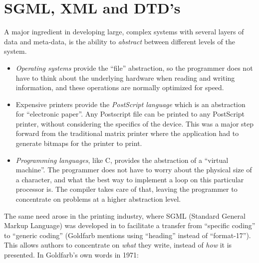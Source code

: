 
\chapter{SGML, XML and DTD's}
\label{cha:sgml-xml-and-dtd's}


A major ingredient in developing large, complex systems with several
layers of data and meta-data, is the ability to \textit{abstract}
between different levels of the system.

\begin{itemize}
\item
  
  \textit{Operating systems} provide the ``file'' abstraction, so the
  programmer does not have to think about the underlying hardware when
  reading and writing information, and these operations are normally
  optimized for speed.

\item
  
  Expensive printers provide the \textit{PostScript language} which is
  an abstraction for ``electronic paper''.  Any Postscript file can be
  printed to any PostScript printer, without considering the specifics
  of the device.  This was a major step forward from the traditional
  matrix printer where the application had to generate bitmaps for the
  printer to print.
  
\item
  
  \textit{Programming languages}, like C, provides the abstraction of
  a ``virtual machine''.  The programmer does not have to worry about
  the physical size of a character, and what the best way to implement
  a loop on this particular processor is.  The compiler takes care of
  that, leaving the programmer to concentrate on problems at a higher
  abstraction level.
  
\end{itemize}



The same need arose in the printing industry, where SGML (Standard
General Markup Language) was developed in
 to facilitate a transfer from ``specific coding''
to ``generic coding'' (Goldfarb mentions using ``heading'' instead of
``format-17'').  This allows authors to concentrate on \textit{what}
they write, instead of \textit{how} it is presented.  In Goldfarb's
own words in 1971:

